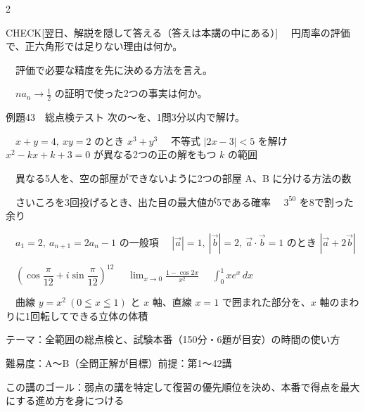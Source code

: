 \documentclass[paper=b5j, fontsize=8pt, fleqn, twoside]{jlreq}
\begin{document}
\begin{multicols*}{2}
  \begin{ptbs}{CHECK}[翌日、解説を隠して答える（答えは本講の中にある）]
    　円周率の評価で、正六角形では足りない理由は何か。\par
    　評価で必要な精度を先に決める方法を言え。\par
    　$na_n\to\frac12$ の証明で使った2つの事実は何か。
  \end{ptbs}

  \notefill
\end{multicols*}

\begin{ascolorbox4A}[出典：オリジナル]{例題43　総点検テスト}
  次の〜を、1問3分以内で解け。\par
  　$x+y=4,\ xy=2$ のとき $x^3+y^3$\qquad
  　不等式 $|2x-3|<5$ を解け\qquad
  　$x^2-kx+k+3=0$ が異なる2つの正の解をもつ $k$ の範囲\par
  　異なる5人を、空の部屋ができないように2つの部屋 A、B に分ける方法の数\par
  　さいころを3回投げるとき、出た目の最大値が5である確率\qquad
  　$3^{50}$ を8で割った余り\par
  　$a_1=2,\ a_{n+1}=2a_n-1$ の一般項\qquad
  　$|\vec a|=1,\ |\vec b|=2,\ \vec a\cdot\vec b=1$ のとき $|\vec a+2\vec b|$\par
  　$\left(\cos\dfrac\pi{12}+i\sin\dfrac\pi{12}\right)^{12}$\qquad
  　$\displaystyle\lim_{x\to0}\frac{1-\cos2x}{x^2}$\qquad
  　$\displaystyle\int_0^1xe^x\,dx$\par
  　曲線 $y=x^2\ (0\leqq x\leqq1)$ と $x$ 軸、直線 $x=1$ で囲まれた部分を、$x$ 軸のまわりに1回転してできる立体の体積
\end{ascolorbox4A}

\begin{Data}
  テーマ：全範囲の総点検と、試験本番（150分・6題が目安）の時間の使い方\par
  難易度：A〜B（全問正解が目標）\quad 前提：第1〜42講\par
  この講のゴール：弱点の講を特定して復習の優先順位を決め、本番で得点を最大にする進め方を身につける
\end{Data}
\end{document}
